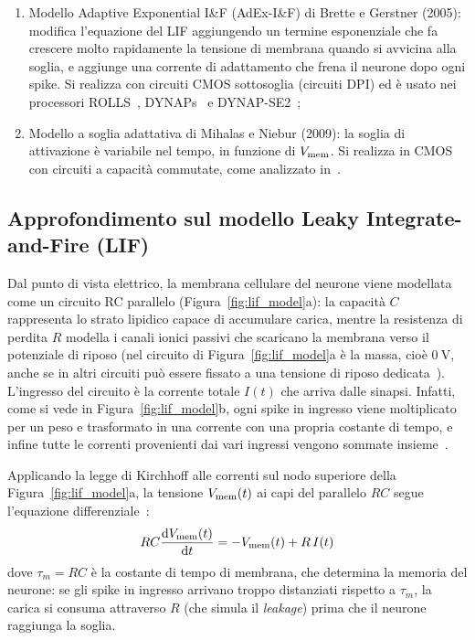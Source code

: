 \begin{itemize}
\begin{enumerate}[label=(\alph*)]
    \item Modello Adaptive Exponential I\&F (AdEx-I\&F) di Brette e Gerstner (2005): modifica l'equazione del LIF aggiungendo un termine esponenziale che fa crescere molto rapidamente la tensione di membrana quando si avvicina alla soglia, e aggiunge una corrente di adattamento che frena il neurone dopo ogni spike. Si realizza con circuiti CMOS sottosoglia (circuiti DPI) ed è usato nei processori ROLLS~\cite{qiao2015}, DYNAPs~\cite{moradi2018} e DYNAP-SE2~\cite{bartels2025};
    \item Modello a soglia adattativa di Mihalas e Niebur (2009): la soglia di attivazione è variabile nel tempo, in funzione di $V_{\mathrm{mem}}$. Si realizza in CMOS con circuiti a capacità commutate, come analizzato in~\cite{indiveri2011}.
  \end{enumerate}
\end{itemize}

\subsection{Approfondimento sul modello Leaky Integrate-and-Fire (LIF)}
\label{subsec:modello_lif}

Dal punto di vista elettrico, la membrana cellulare del neurone viene modellata come un circuito RC parallelo (Figura~\ref{fig:lif_model}a): la capacità $C$ rappresenta lo strato lipidico capace di accumulare carica, mentre la resistenza di perdita $R$ modella i canali ionici passivi che scaricano la membrana verso il potenziale di riposo (nel circuito di Figura~\ref{fig:lif_model}a è la massa, cioè $\SI{0}{\volt}$, anche se in altri circuiti può essere fissato a una tensione di riposo dedicata~\cite{indiveri2011}). L'ingresso del circuito è la corrente totale $I(t)$ che arriva dalle sinapsi. Infatti, come si vede in Figura~\ref{fig:lif_model}b, ogni spike in ingresso viene moltiplicato per un peso e trasformato in una corrente con una propria costante di tempo, e infine tutte le correnti provenienti dai vari ingressi vengono sommate insieme~\cite{li2024}.

Applicando la legge di Kirchhoff alle correnti sul nodo superiore della Figura~\ref{fig:lif_model}a, la tensione $V_{\mathrm{mem}}(t)$ ai capi del parallelo $RC$ segue l'equazione differenziale~\cite{li2024}:
\begin{equation}
  RC \frac{\mathrm{d}V_{\mathrm{mem}}(t)}{\mathrm{d}t} = -V_{\mathrm{mem}}(t) + R\,I(t)
  \label{eq:lif_ode}
\end{equation}
dove $\tau_m = RC$ è la costante di tempo di membrana, che determina la memoria del neurone: se gli spike in ingresso arrivano troppo distanziati rispetto a $\tau_m$, la carica si consuma attraverso $R$ (che simula il \emph{leakage}) prima che il neurone raggiunga la soglia.

